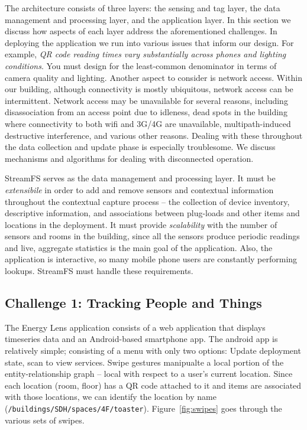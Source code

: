 The architecture consists of three layers: the sensing and tag layer, the data management and processing layer, and the application
layer.  In this section we discuss how aspects of each layer address the aforementioned challenges.
In deploying the application we run into various issues that inform our design.  
For example, \emph{QR code reading times vary substantially across phones
and lighting conditions}.  You must design for the least-common denominator in terms of camera quality and lighting.
Another aspect to consider is network access.  Within our building, although connectivity is mostly ubiquitous, network
access can be intermittent.  Network access may be unavailable for several reasons, including disassociation from an access point due
to idleness, dead spots in the building where connectivity to both wifi and 3G/4G are unavailable, multipath-induced
destructive interference, and various other reasons.  Dealing with these throughout the data collection and update phase is
especially troublesome.  We discuss mechanisms and algorithms for dealing with disconnected operation.

StreamFS serves as the data management and processing layer.  It must be \emph{extensibile} in order to add and remove
sensors and contextual information throughout the contextual capture process -- the collection of device inventory,
descriptive information, and associations between plug-loads and other items and locations in the deployment.
It must provide \emph{scalability} with the number of sensors and rooms in the building, since all the sensors produce periodic readings
and live, aggregate statistics is the main goal of the application.  Also, the application is interactive, so many mobile
phone users are constantly performing lookups.  StreamFS must handle these requirements.


\subsection{Challenge 1: Tracking People and Things}
\label{sec:tracking}

The Energy Lens application consists of a web application that displays timeseries data and an Android-based smartphone
app.
The android app is relatively simple; consisting of a menu with only two options: Update deployment state, scan to view services.
Swipe gestures manipualte a local portion of the entity-relationship graph -- local with respect to a user's current location.
Since each location (room, floor) has a QR code attached to it and items are associated with those locations, we
can identify the location by name (\texttt{/buildings/SDH/spaces/4F/toaster}).  
Figure~\ref{fig:swipes} goes through the various sets 
of swipes.

